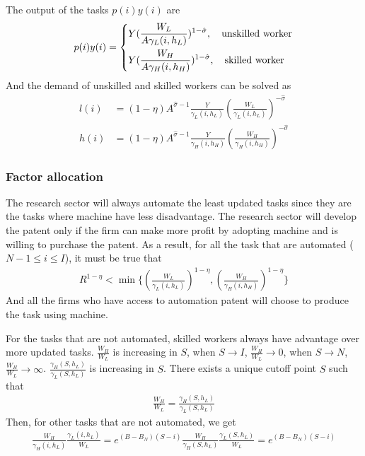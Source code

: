 \documentclass[12pt]{article}
\begin{document}
The output of the tasks $p(i)y(i)$ are
\begin{align*}
p(i)y(i) =
\begin{dcases}
Y(\frac{W_L}{A\gamma_L(i,h_L)})^{1-\hat{\sigma}}, \quad \text{unskilled worker}  \\
Y(\frac{W_H}{A\gamma_H(i,h_H)})^{1-\hat{\sigma}}, \quad \text{skilled worker}
\end{dcases}
\end{align*}
And the demand of unskilled and skilled workers can be solved as 
\begin{align*}
l(i) &= (1-\eta)A^{\hat{\sigma}-1}\frac{Y}{\gamma_L(i,h_L)}(\frac{W_L}{\gamma_L(i,h_L)})^{-\hat{\sigma}} \\
h(i) &= (1-\eta)A^{\hat{\sigma}-1}\frac{Y}{\gamma_H(i,h_H)}(\frac{W_H}{\gamma_H(i,h_H)})^{-\hat{\sigma}} 
\end{align*}

\subsubsection*{Factor allocation}
The research sector will always automate the least updated tasks since they are the tasks where machine have less disadvantage. The research sector will develop the patent only if the firm can make more profit by adopting machine and is willing to purchase the patent. As a result, for all the task that are automated ($N-1 \le i \le I$), it must be true that 
\begin{align*}
R^{1-\eta} < \min \{(\frac{W_L}{\gamma_L(i,h_L)})^{1-\eta},(\frac{W_H}{\gamma_H(i,h_H)})^{1-\eta}\}
\end{align*}
And all the firms who have access to automation patent will choose to produce the task using machine. 

For the tasks that are not automated, skilled workers always have advantage over more updated tasks. $\frac{W_H}{W_L}$ is increasing in $S$, when $S\to I$, $\frac{W_H}{W_L}\to 0$, when $S\to N$, $\frac{W_H}{W_L}\to \infty$. $ \frac{\gamma_H(S,h_L)}{\gamma_L(S,h_L)}$ is increasing in $S$. There exists a unique cutoff point $S$ such that 
\begin{align*}
\frac{W_H}{W_L} = \frac{\gamma_H(S,h_L)}{\gamma_L(S,h_L)}
\end{align*}
Then, for other tasks that are not automated, we get 
\begin{align*}
\frac{W_H}{\gamma_H(i,h_L)}\frac{\gamma_L(i,h_L)}{W_L} = e^{(B-B_N)(S-i)}\frac{W_H}{\gamma_H(S,h_L)}\frac{\gamma_L(S,h_L)}{W_L} =  e^{(B-B_N)(S-i)}
\end{align*}
\end{document}
